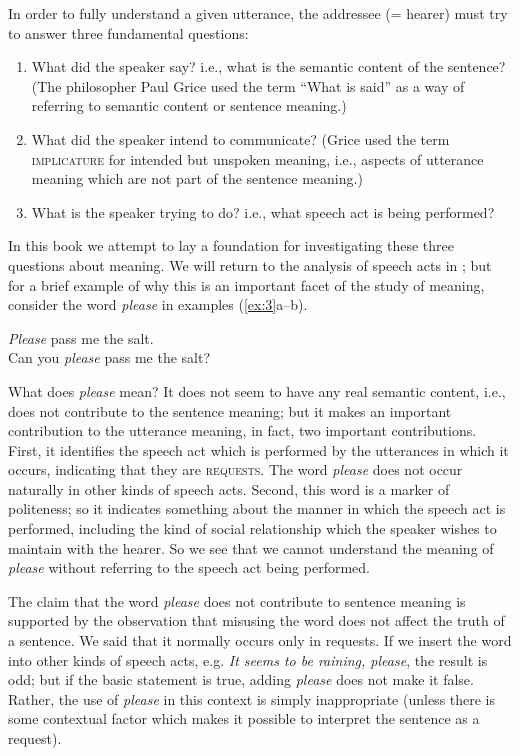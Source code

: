 In order to fully understand a given utterance, the addressee (= hearer) must try to answer three fundamental questions:


\begin{enumerate}
\item What did the speaker say? i.e., what is the semantic content of the sentence? (The philosopher Paul Grice used the term “What is said” as a way of referring to semantic content or sentence meaning.)
\item What did the speaker intend to communicate? (Grice used the term \textsc{implicature} for intended but unspoken meaning, i.e., aspects of utterance meaning which are not part of the sentence meaning.)
\item What is the speaker trying to do? i.e., what speech act is being performed?
\end{enumerate}

In this book we attempt to lay a foundation for investigating these three questions about meaning. We will return to the analysis of speech acts in ; but for a brief example of why this is an important facet of the study of meaning, consider the word \textit{please} in examples (\ref{ex:3}a--b).


\ea \label{ex:3}
\ea \textit{Please} pass me the salt.\\
\ex Can you \textit{please} pass me the salt?
                       \z
\z


What does \textit{please} mean? It does not seem to have any real semantic content, i.e., does not contribute to the sentence meaning; but it makes an important contribution to the utterance meaning, in fact, two important contributions. First, it identifies the speech act which is performed by the utterances in which it occurs, indicating that they are \textsc{requests}. The word \textit{please} does not occur naturally in other kinds of speech acts. Second, this word is a marker of politeness; so it indicates something about the manner in which the speech act is performed, including the kind of social relationship which the speaker wishes to maintain with the hearer. So we see that we cannot understand the meaning of \textit{please} without referring to the speech act being performed.



The claim that the word \textit{please} does not contribute to sentence meaning is supported by the observation that misusing the word does not affect the truth of a sentence. We said that it normally occurs only in requests. If we insert the word into other kinds of speech acts, e.g. \textit{It seems to be raining, please}, the result is odd; but if the basic statement is true, adding \textit{please} does not make it false. Rather, the use of \textit{please} in this context is simply inappropriate (unless there is some contextual factor which makes it possible to interpret the sentence as a request).




